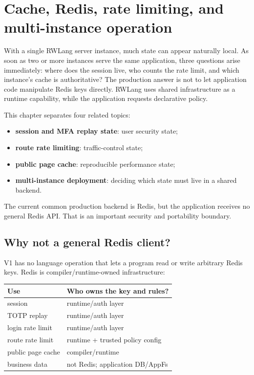 \chapter{Cache, Redis, rate limiting, and multi-instance operation}

With a single RWLang server instance, much state can appear naturally local. As soon as two or more instances serve the same application, three questions arise immediately: where does the session live, who counts the rate limit, and which instance's cache is authoritative? The production answer is not to let application code manipulate Redis keys directly. RWLang uses shared infrastructure as a runtime capability, while the application requests declarative policy.

This chapter separates four related topics:

\begin{itemize}
  \item \textbf{session and MFA replay state}: user security state;
  \item \textbf{route rate limiting}: traffic-control state;
  \item \textbf{public page cache}: reproducible performance state;
  \item \textbf{multi-instance deployment}: deciding which state must live in a shared backend.
\end{itemize}

The current common production backend is Redis, but the application receives no general Redis API. That is an important security and portability boundary.

\section{Why not a general Redis client?}

V1 has no language operation that lets a program read or write arbitrary Redis keys. Redis is compiler/runtime-owned infrastructure:

\begin{center}
\begin{tabularx}{\textwidth}{@{}L{0.27\textwidth}Y@{}}
\toprule
\textbf{Use} & \textbf{Who owns the key and rules?} \\
\midrule
session & runtime/auth layer \\
TOTP replay & runtime/auth layer \\
login rate limit & runtime/auth layer \\
route rate limit & runtime + trusted policy config \\
public page cache & compiler/runtime \\
business data & not Redis; application DB/AppFs \\
\bottomrule
\end{tabularx}
\end{center}

